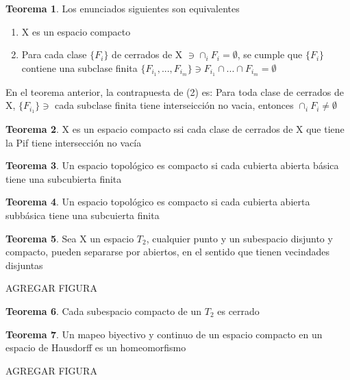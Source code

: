 \documentclass{article}
\theoremstyle{definition}
\newtheorem{theorem}{Teorema}[section]
\begin{document}

\begin{theorem}
	Los enunciados siguientes son equivalentes
	\begin{enumerate}
	\item X es un espacio compacto
	\item Para cada clase $\{F_i\}$ de cerrados de X $\ni\cap_iF_i=\emptyset$, se cumple que $\{F_i\}$ contiene una subclase finita $\{F_{i_1},...,F_{i_m}\}\ni F_{i_1}\cap ...\cap F_{i_m}=\emptyset$
\end{enumerate}
En el teorema anterior, la contrapuesta de (2) es: Para toda clase de cerrados de X, $\{F_{i_1}\}\ni$ cada subclase finita tiene interseicción no vacia, entonces $\cap_iF_i\neq\emptyset$ 
\end{theorem}


\begin{theorem}
	X es un espacio compacto ssi cada clase de cerrados de X que tiene la Pif tiene intersección no vacía
\end{theorem}


\begin{theorem}

	Un espacio topológico es compacto si cada cubierta abierta básica tiene una subcubierta finita
\end{theorem}


\begin{theorem}
	Un espacio topológico es compacto si cada cubierta abierta subbásica tiene una subcuierta finita
\end{theorem}


\begin{theorem}
	Sea X un espacio $T_2$, cualquier punto y un subespacio disjunto y compacto, pueden separarse por abiertos, en el sentido que tienen vecindades disjuntas
	
	AGREGAR FIGURA
\end{theorem}


\begin{theorem}

	Cada subespacio compacto de un $T_2$ es cerrado
\end{theorem}


\begin{theorem}
	Un mapeo biyectivo y continuo de un espacio compacto en un espacio de Hausdorff es un homeomorfismo
	
	AGREGAR FIGURA
\end{theorem}
\end{document}
